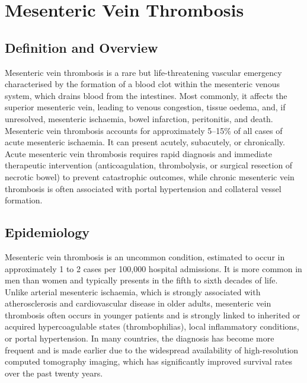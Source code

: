 \chapter{Mesenteric Vein Thrombosis}

\section*{Definition and Overview}
Mesenteric vein thrombosis is a rare but life-threatening vascular emergency characterised by the formation of a blood clot within the mesenteric venous system, which drains blood from the intestines. Most commonly, it affects the superior mesenteric vein, leading to venous congestion, tissue oedema, and, if unresolved, mesenteric ischaemia, bowel infarction, peritonitis, and death. Mesenteric vein thrombosis accounts for approximately 5--15\% of all cases of acute mesenteric ischaemia. It can present acutely, subacutely, or chronically. Acute mesenteric vein thrombosis requires rapid diagnosis and immediate therapeutic intervention (anticoagulation, thrombolysis, or surgical resection of necrotic bowel) to prevent catastrophic outcomes, while chronic mesenteric vein thrombosis is often associated with portal hypertension and collateral vessel formation.

\section*{Epidemiology}
Mesenteric vein thrombosis is an uncommon condition, estimated to occur in approximately 1 to 2 cases per 100,000 hospital admissions. It is more common in men than women and typically presents in the fifth to sixth decades of life. Unlike arterial mesenteric ischaemia, which is strongly associated with atherosclerosis and cardiovascular disease in older adults, mesenteric vein thrombosis often occurs in younger patients and is strongly linked to inherited or acquired hypercoagulable states (thrombophilias), local inflammatory conditions, or portal hypertension. In many countries, the diagnosis has become more frequent and is made earlier due to the widespread availability of high-resolution computed tomography imaging, which has significantly improved survival rates over the past twenty years.

